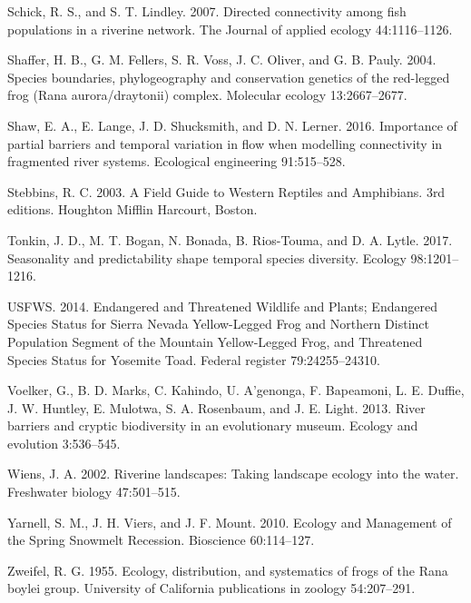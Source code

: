\documentclass[twoside,12pt,final]{ucthesis-CA2012} %
\begin{document}
\begin{ucmainmatter}
\leavevmode\hypertarget{ref-schick_directed_2007}{}%
Schick, R. S., and S. T. Lindley. 2007. Directed connectivity among fish
populations in a riverine network. The Journal of applied ecology
44:1116--1126.

\leavevmode\hypertarget{ref-shaffer_species_2004}{}%
Shaffer, H. B., G. M. Fellers, S. R. Voss, J. C. Oliver, and G. B.
Pauly. 2004. Species boundaries, phylogeography and conservation
genetics of the red-legged frog (Rana aurora/draytonii) complex.
Molecular ecology 13:2667--2677.

\leavevmode\hypertarget{ref-shaw_importance_2016}{}%
Shaw, E. A., E. Lange, J. D. Shucksmith, and D. N. Lerner. 2016.
Importance of partial barriers and temporal variation in flow when
modelling connectivity in fragmented river systems. Ecological
engineering 91:515--528.

\leavevmode\hypertarget{ref-stebbins_field_2003}{}%
Stebbins, R. C. 2003. A Field Guide to Western Reptiles and Amphibians.
3rd editions. Houghton Mifflin Harcourt, Boston.

\leavevmode\hypertarget{ref-tonkin_seasonality_2017}{}%
Tonkin, J. D., M. T. Bogan, N. Bonada, B. Rios-Touma, and D. A. Lytle.
2017. Seasonality and predictability shape temporal species diversity.
Ecology 98:1201--1216.

\leavevmode\hypertarget{ref-usfws_endangered_2014}{}%
USFWS. 2014. Endangered and Threatened Wildlife and Plants; Endangered
Species Status for Sierra Nevada Yellow-Legged Frog and Northern
Distinct Population Segment of the Mountain Yellow-Legged Frog, and
Threatened Species Status for Yosemite Toad. Federal register
79:24255--24310.

\leavevmode\hypertarget{ref-voelker_river_2013}{}%
Voelker, G., B. D. Marks, C. Kahindo, U. A'genonga, F. Bapeamoni, L. E.
Duffie, J. W. Huntley, E. Mulotwa, S. A. Rosenbaum, and J. E. Light.
2013. River barriers and cryptic biodiversity in an evolutionary museum.
Ecology and evolution 3:536--545.

\leavevmode\hypertarget{ref-wiens_riverine_2002}{}%
Wiens, J. A. 2002. Riverine landscapes: Taking landscape ecology into
the water. Freshwater biology 47:501--515.

\leavevmode\hypertarget{ref-yarnell_ecology_2010}{}%
Yarnell, S. M., J. H. Viers, and J. F. Mount. 2010. Ecology and
Management of the Spring Snowmelt Recession. Bioscience 60:114--127.

\leavevmode\hypertarget{ref-zweifel_ecology_1955}{}%
Zweifel, R. G. 1955. Ecology, distribution, and systematics of frogs of
the Rana boylei group. University of California publications in zoology
54:207--291.

\end{ucmainmatter}
\end{document}
